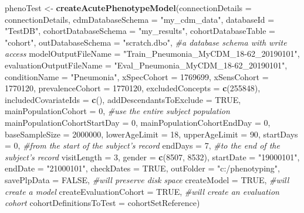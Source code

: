 \documentclass[
]{article}
\newenvironment{Shaded}{\begin{snugshade}}{\end{snugshade}}
\newcommand{\CommentTok}[1]{\textcolor[rgb]{0.56,0.35,0.01}{\textit{#1}}}
\newcommand{\DataTypeTok}[1]{\textcolor[rgb]{0.13,0.29,0.53}{#1}}
\newcommand{\DecValTok}[1]{\textcolor[rgb]{0.00,0.00,0.81}{#1}}
\newcommand{\KeywordTok}[1]{\textcolor[rgb]{0.13,0.29,0.53}{\textbf{#1}}}
\newcommand{\NormalTok}[1]{#1}
\newcommand{\OtherTok}[1]{\textcolor[rgb]{0.56,0.35,0.01}{#1}}
\newcommand{\StringTok}[1]{\textcolor[rgb]{0.31,0.60,0.02}{#1}}
\begin{document}
\begin{Shaded}
\begin{Highlighting}[]
\NormalTok{phenoTest <-}\StringTok{ }\KeywordTok{createAcutePhenotypeModel}\NormalTok{(}\DataTypeTok{connectionDetails =}\NormalTok{ connectionDetails,}
                \DataTypeTok{cdmDatabaseSchema =} \StringTok{"my_cdm_data"}\NormalTok{,}
                \DataTypeTok{databaseId =} \StringTok{"TestDB"}\NormalTok{,}
                \DataTypeTok{cohortDatabaseSchema =} \StringTok{"my_results"}\NormalTok{,}
                \DataTypeTok{cohortDatabaseTable =} \StringTok{"cohort"}\NormalTok{,}
                \DataTypeTok{outDatabaseSchema =} \StringTok{"scratch.dbo"}\NormalTok{, }\CommentTok{#a database schema with write access}
                \DataTypeTok{modelOutputFileName =} \StringTok{"Train_Pneumonia_MyCDM_18-62_20190101"}\NormalTok{,}
                \DataTypeTok{evaluationOutputFileName =} \StringTok{"Eval_Pneumonia_MyCDM_18-62_20190101"}\NormalTok{,}
                \DataTypeTok{conditionName =} \StringTok{"Pneumonia"}\NormalTok{,}
                \DataTypeTok{xSpecCohort =} \DecValTok{1769699}\NormalTok{,}
                \DataTypeTok{xSensCohort =} \DecValTok{1770120}\NormalTok{,}
                \DataTypeTok{prevalenceCohort =} \DecValTok{1770120}\NormalTok{,}
                \DataTypeTok{excludedConcepts =} \KeywordTok{c}\NormalTok{(}\DecValTok{255848}\NormalTok{), }
                \DataTypeTok{includedCovariateIds =} \KeywordTok{c}\NormalTok{(),}
                \DataTypeTok{addDescendantsToExclude =} \OtherTok{TRUE}\NormalTok{,}
                \DataTypeTok{mainPopulationCohort =} \DecValTok{0}\NormalTok{, }\CommentTok{#use the entire subject population}
                \DataTypeTok{mainPopulationCohortStartDay =} \DecValTok{0}\NormalTok{,}
                \DataTypeTok{mainPopulationCohortEndDay =} \DecValTok{0}\NormalTok{,}
                \DataTypeTok{baseSampleSize =} \DecValTok{2000000}\NormalTok{,}
                \DataTypeTok{lowerAgeLimit =} \DecValTok{18}\NormalTok{, }
                \DataTypeTok{upperAgeLimit =} \DecValTok{90}\NormalTok{,}
                \DataTypeTok{startDays =} \DecValTok{0}\NormalTok{, }\CommentTok{#from the start of the subject's record}
                \DataTypeTok{endDays =} \DecValTok{7}\NormalTok{, }\CommentTok{#to the end of the subject's record}
                \DataTypeTok{visitLength =} \DecValTok{3}\NormalTok{,}
                \DataTypeTok{gender =} \KeywordTok{c}\NormalTok{(}\DecValTok{8507}\NormalTok{, }\DecValTok{8532}\NormalTok{),}
                \DataTypeTok{startDate =} \StringTok{"19000101"}\NormalTok{,}
                \DataTypeTok{endDate =} \StringTok{"21000101"}\NormalTok{,}
                \DataTypeTok{checkDates =} \OtherTok{TRUE}\NormalTok{,}
                \DataTypeTok{outFolder =} \StringTok{"c:/phenotyping"}\NormalTok{,}
                \DataTypeTok{savePlpData =} \OtherTok{FALSE}\NormalTok{, }\CommentTok{#will preserve disk space}
                \DataTypeTok{createModel =} \OtherTok{TRUE}\NormalTok{, }\CommentTok{#will create a model}
                \DataTypeTok{createEvaluationCohort =} \OtherTok{TRUE}\NormalTok{, }\CommentTok{#will create an evaluation cohort}
                \DataTypeTok{cohortDefinitionsToTest =}\NormalTok{ cohortSetReference)}
\end{Highlighting}
\end{Shaded}
\end{document}
